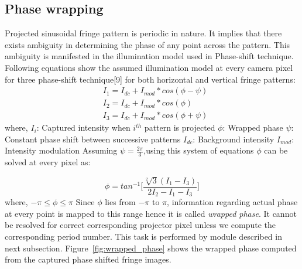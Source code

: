 \subsection{Phase wrapping}
Projected sinusoidal fringe pattern is periodic in nature. It implies that there exists ambiguity in determining the phase of any point across the pattern. This ambiguity is manifested in the illumination model used in Phase-shift technique. Following equations show the assumed illumination model at every camera pixel for three phase-shift technique[9] for both horizontal and vertical fringe patterns:\newline
\begin{equation}
\begin{aligned}
& I_1=I_{dc}+I_{mod}*cos(\phi-\psi) \\
& I_2=I_{dc}+I_{mod}*cos(\phi) \\
& I_3=I_{dc}+I_{mod}*cos(\phi+\psi)
\end{aligned}
\end{equation}
\noindent
where,\newline
$I_i$: Captured intensity when $i^{th}$ pattern is projected\newline
$\phi$: Wrapped phase\newline
$\psi$: Constant phase shift between successive patterns\newline
$I_{dc}$: Background intensity\newline
$I_{mod}$: Intensity modulation\newline
\noindent
Assuming $\psi=\frac{2\pi}{3}$,using this system of equations $\phi$ can be solved at every pixel as:\newline

\begin{equation}
\phi=tan^{-1}\bigg[\frac{\sqrt[2]{3}(I_1-I_3)}{2I_2-I_1-I_3}\bigg]
\end{equation}
where, $-\pi\leq\phi\leq\pi$ \newline
\noindent
Since $\phi$ lies from $-\pi$ to $\pi$, information regarding actual phase at every point is mapped to this range hence it is called \textit{wrapped phase}. It cannot be resolved for correct corresponding projector pixel unless we compute the corresponding period number. This task is performed by module described in next subsection. Figure~\ref{fig:wrapped_phase} shows the wrapped phase computed from the captured phase shifted fringe images.

